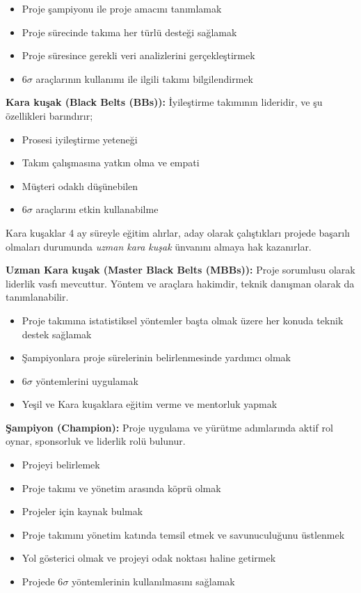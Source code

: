 \documentclass[
]{book}
\providecommand{\tightlist}{%
  \setlength{\itemsep}{0pt}\setlength{\parskip}{0pt}}
\begin{document}
\begin{itemize}
\tightlist
\item
  Proje şampiyonu ile proje amacını tanımlamak
\item
  Proje sürecinde takıma her türlü desteği sağlamak
\item
  Proje süresince gerekli veri analizlerini gerçekleştirmek
\item
  6\(\sigma\) araçlarının kullanımı ile ilgili takımı bilgilendirmek
\end{itemize}

\textbf{Kara kuşak (Black Belts (BBs)):} İyileştirme takımının lideridir, ve şu özellikleri barındırır;

\begin{itemize}
\tightlist
\item
  Prosesi iyileştirme yeteneği
\item
  Takım çalışmasına yatkın olma ve empati
\item
  Müşteri odaklı düşünebilen
\item
  6\(\sigma\) araçlarını etkin kullanabilme
\end{itemize}

Kara kuşaklar 4 ay süreyle eğitim alırlar, aday olarak çalıştıkları projede başarılı olmaları durumunda \emph{uzman kara kuşak} ünvanını almaya hak kazanırlar.

\textbf{Uzman Kara kuşak (Master Black Belts (MBBs)):} Proje sorumlusu olarak liderlik vasfı mevcuttur. Yöntem ve araçlara hakimdir, teknik danışman olarak da tanımlanabilir.

\begin{itemize}
\tightlist
\item
  Proje takımına istatistiksel yöntemler başta olmak üzere her konuda teknik destek sağlamak
\item
  Şampiyonlara proje sürelerinin belirlenmesinde yardımcı olmak
\item
  6\(\sigma\) yöntemlerini uygulamak
\item
  Yeşil ve Kara kuşaklara eğitim verme ve mentorluk yapmak
\end{itemize}

\textbf{Şampiyon (Champion):} Proje uygulama ve yürütme adımlarında aktif rol oynar, sponsorluk ve liderlik rolü bulunur.

\begin{itemize}
\tightlist
\item
  Projeyi belirlemek
\item
  Proje takımı ve yönetim arasında köprü olmak
\item
  Projeler için kaynak bulmak
\item
  Proje takımını yönetim katında temsil etmek ve savunuculuğunu üstlenmek
\item
  Yol gösterici olmak ve projeyi odak noktası haline getirmek
\item
  Projede 6\(\sigma\) yöntemlerinin kullanılmasını sağlamak
\end{itemize}
\end{document}
